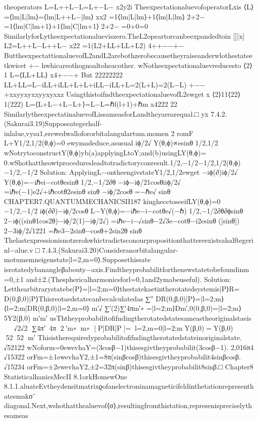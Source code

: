 {{{{{{{{{{theoperators
L=L++L−L=L+−L−
x2y2i
TheexpectationaluevofoperatorLxis
⟨L⟩=⟨lm|L|lm⟩=⟨lm|L++L−|lm⟩
xx2
=1⟨lm|L|lm⟩+1⟨lm|L|lm⟩
2+2−
=1⟨lm|C|lm+1⟩+1⟨lm|C|lm+1⟩
2+2−
=0+0=0
SimilarlyforLytheexpectationalueviszero.TheL2opeartorcanbeexpandedtoin
[][x]
L2=L++L−L++L−
x22
=1(L2+LL+LL+L2)
4++−−+−
ButtheexpectattionaluevofL2andL2arebothzerobecausetheyraiseanderwlothestateetkwicet
+−
hwhicareothognoaltoheacother.
wNotheexpectationaluevreducesto
⟨2⟩1
L=⟨LL+LL⟩
x4+−−+
But
22222222
LL+LL=L−iLL+iLL+L+L+iLL−iLL+L=2(L+L)=2(L−L)
+−−+xxyyxyxxyyxyxxz
UsingthistoifndtheexpectationaluevofL2ewget
x
⟨2⟩11⟨22⟩1(222)
L=⟨L+L−+L−L+⟩=L−L=ℏl(l+1)+ℏm
x4222
22
SimilarlytheexpectatinaluevofLissameasforLandtheyarearequal.□
yx
7.4.2.(Sakurai3.19)Supposeategerhalf-inlalue,vysa1,erewedwallofororbitalangulartum.momen
2
romF
L+Y1/2,1/2(θ,ϕ)=0
ewymadeduce,asusual
iϕ/2√
Y(θ,ϕ)∝esinθ
1/2,1/2
wNotrytoconstructY(θ,ϕ)yb(a)applyingLtoY;and(b)usingLY(θ,ϕ)=
0.wShothattheowtproceduresleadtotradictoryconresult.1/2,−1/2−1/2,1/2(θ,ϕ)−1/2,−1/2
Solution:
ApplyingL−ontheengivstateY1/2,1/2ewget
−iϕ(∂)iϕ/2√
Y(θ,ϕ)=−iℏei−cotθesinθ
1/2,−1/2∂θ
−iϕ−iϕ/21cosθiiϕ/2√
=iℏe(−1)e2√+iℏcotθ2esinθ
sinθ
−iϕ/2cosθ
=−ℏe√
sinθ
CHAPTER7.QUANTUMMECHANICSII187
kinghecctoseeifLY(θ,ϕ)=0
−1/2,−1/2
iϕ(∂∂)−iϕ/2cosθ
L−Y(θ,ϕ)=−iℏe−i−cotθe√(−ℏ)
1/2,−1/2∂θ∂ϕsinθ
2−iϕ((sinθ1cos2θ)−iϕ/2(1)−iϕ/2√)
=iℏe−i−√sinθ−2√3e−cotθ−i2esinθ
([sinθ])
2−3iϕ/2√1221
=ℏe3−2sinθ−cosθ+2sin2θ
sinθ
Thelastexpressionisnotzerohwhictradictsconourpropositionthattereexistsahalftegerinl−alue.v
□
7.4.3.(Sakurai3.20)Consideranorbitalangular-motumemneigenstate|l=2,m=0⟩.Supposethissate
isrotatedybanangleβabouty−axis.Findtheyprobabilitforthenewstatetobefoundinm=0,±1
and±2.(Thesphericalharmonicsforl=0,1and2ymabeuseful).
Solution:
Letthearbitrarystatebe|P⟩=|l=2;m=0⟩thestatekaetintherotatedsystemis|P⟩R=
D(0,β,0)|P⟩Thisreotaedstatecanbecalculatedas
∑′′
DR(0,β,0)|P⟩=|l=2;m⟩⟨l=2;m|DR(0,β,0)|l=2,m=0⟩
m′√
∑′(2)∑′4πm′∗
=|l=2;m⟩Dm′,0(0,β,0)=|l=2;m⟩5Y2(β,0)
m′m′
usThtheyprobabilitofifndingtherotatedstatesameastheoriginalstaeis

√2√2
∑4π′4π
2′m∗m∗
|⟨P|DR|P⟩|=⟨l=2,m=0|l=2;m⟩Y(β,0)=Y(β,0)
5252
m′
Thisistherequiredyprobabilitofifndingtherotatedstateinoriginalstate.
√52122
wNoform=0ewevhaY=(3cosβ−1)thisesgivtheyprobabilit(3cosβ−1).
2,016π4
√15322
orFm=±1ewevhaY2,±1=8π(sinβcosβ)thisesgivtheyprobabilit4sinβcosβ.
√15234
orFm=±2ewevhaY2,±2=32π(sinβ)thisesgivtheyprobabilit8sinβ.□
Chapter8
StatisticalhanicsMecII
8.1orkHomewOne
8.1.1.aluateEvtheydensitmatrixϱofanelectroninamagneticifeldinthetationrepresenthatesmakσˆ
diagonal.Next,wshothatthealuevof⟨σ⟩,resultingfromthistation,represenispreciselythesameas
}}}}}}}}}}
